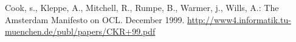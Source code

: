 \documentclass{llncs}
\begin{document}






\begin{thebibliography}{}
	Cook, s., Kleppe, A., Mitchell, R., Rumpe, B., Warmer, j., Wills, A.:
	The Amsterdam Manifesto on OCL. December 1999.
	\url{http://www4.informatik.tu-muenchen.de/publ/papers/CKR+99.pdf}
	
\end{thebibliography}
\end{document}
